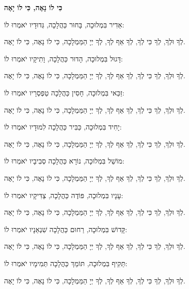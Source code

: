 \begin{center}
{\large \bfseries
כִּי לוֹ נָאֶה, כִּי לוֹ יָאֶה
}

אַדִיר בִּמְלוּכָה, בָּחוּר כַּהֲלָכָה, גְּדוּדָיו יֹאמְרוּ לוֹ: 

לְךָ וּלְךָ, לְךָ כִּי לְךָ, לְךָ אַף לְךָ, לְךָ יְיָ הַמַּמְלָכָה, כִּי לוֹ נָאֶה, כִּי לוֹ יָאֶה.

\vspace{1em}

דָּגוּל בִּמְלוּכָה, הָדוּר כַּהֲלָכָה, וָתִיקָיו יֹאמְרוּ לוֹ: 

לְךָ וּלְךָ, לְךָ כִּי לְךָ, לְךָ אַף לְךָ, לְךָ יְיָ הַמַּמְלָכָה, כִּי לוֹ נָאֶה, כִּי לוֹ יָאֶה.

\vspace{1em}

זַכַּאי בִּמְלוּכָה, חָסִין כַּהֲלָכָה טַפְסְרָיו יֹאמְרוּ לוֹ: 

לְךָ וּלְךָ, לְךָ כִּי לְךָ, לְךָ אַף לְךָ, לְךָ יְיָ הַמַּמְלָכָה, כִּי לוֹ נָאֶה, כִּי לוֹ יָאֶה.

\vspace{1em}

יָחִיד בִּמְלוּכָה, כַּבִּיר כַּהֲלָכָה לִמוּדָיו יֹאמְרוּ לוֹ: 

לְךָ וּלְךָ, לְךָ כִּי לְךָ, לְךָ אַף לְךָ, לְךָ יְיָ הַמַּמְלָכָה, כִּי לוֹ נָאֶה, כִּי לוֹ יָאֶה.

\vspace{1em}

מוֹשֵׁל בִּמְלוּכָה, נוֹרָא כַּהֲלָכָה סְבִיבָיו יֹאמְרוּ לוֹ: 

לְךָ וּלְךָ, לְךָ כִּי לְךָ, לְךָ אַף לְךָ, לְךָ יְיָ הַמַּמְלָכָה, כִּי לוֹ נָאֶה, כִּי לוֹ יָאֶה.

\vspace{1em}

עָנָיו בִּמְלוּכָה, פּוֹדֶה כַּהֲלָכָה, צַדִּיקָיו יֹאמְרוּ לוֹ: 

לְךָ וּלְךָ, לְךָ כִּי לְךָ, לְךָ אַף לְךָ, לְךָ יְיָ הַמַּמְלָכָה, כִּי לוֹ נָאֶה, כִּי לוֹ יָאֶה.

\vspace{1em}

קָּדוֹשׁ בִּמְלוּכָה, רַחוּם כַּהֲלָכָה שִׁנְאַנָיו יֹאמְרוּ לוֹ: 

לְךָ וּלְךָ, לְךָ כִּי לְךָ, לְךָ אַף לְךָ, לְךָ יְיָ הַמַּמְלָכָה, כִּי לוֹ נָאֶה, כִּי לוֹ יָאֶה.

\vspace{1em}

תַּקִיף בִּמְלוּכָה, תּוֹמֵךְ כַּהֲלָכָה תְּמִימָיו יֹאמְרוּ לוֹ: 

לְךָ וּלְךָ, לְךָ כִּי לְךָ, לְךָ אַף לְךָ, לְךָ יְיָ הַמַּמְלָכָה, כִּי לוֹ נָאֶה, כִּי לוֹ יָאֶה.
\end{center}
\break

